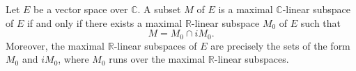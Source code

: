 Let $E$ be a vector space over $\mathbb{C}$. A subset $M$ of $E$ is a maximal $\mathbb{C}$-linear subspace of $E$ if and only if there exists a maximal $\mathbb{R}$-linear subspace $M_0$ of $E$ such that
$$M = M_0 \cap iM_0.$$
Moreover, the maximal $\mathbb{R}$-linear subspaces of $E$ are precisely the sets of the form $M_0$ and $iM_0$, where $M_0$ runs over the maximal $\mathbb{R}$-linear subspaces.
